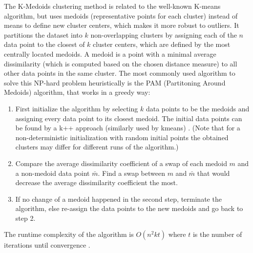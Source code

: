 \marginnote{\textcolor{blue}{Jonas Elpelt}}

The K-Medoids clustering method is related to the well-known K-means algorithm, but uses medoids (representative points for each cluster) instead of means to define new cluster centers, which makes it more robust to outliers\cite{Jin2010}. It partitions the dataset into $k$ non-overlapping clusters by assigning each of the $n$ data point to the closest of $k$ cluster centers, which are defined by the most centrally located medoids. A medoid is a point with a minimal average dissimilarity (which is computed based on the chosen distance measure) to all other data points in the same cluster. The most commonly used algorithm to solve this NP-hard problem heuristically is the PAM (Partitoning Around Medoids) algorithm, that works in a greedy way: \cite{kaufman2009finding} \\
\begin{enumerate}
	\item First initialize the algorithm by selecting $k$ data points to be the medoids and assigning every data point to its closest medoid. The initial data points can be found by a k++ approach (similarly used by kmeans) \cite{scikit-learn-extra}. (Note that for a non-deterministic initialization with random initial points the obtained clusters may differ for different runs of the algorithm.) \\
	\item Compare the average dissimilarity coefficient of a swap of each medoid $m$ and a non-medoid data point $\bar{m}$. Find a swap between $m$ and $\bar{m}$ that would decrease the average dissimilarity coefficient the most. 
	\item If no change of a medoid happened in the second step, terminate the algorithm, else re-assign the data points to the new medoids and go back to step 2. 
\end{enumerate}

The runtime complexity of the algorithm is $O(n^2kt)$ where $t$ is the number of iterations until convergence  \cite{scikit-learn-extra}.